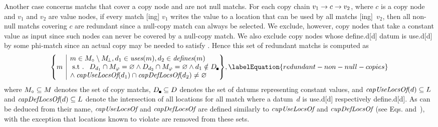 Another case concerns \glspl{match} that cover a \gls{copy node} and are not
\glspl{null match}.
%
For each copy chain \mbox{$v_1 \rightarrow c \rightarrow v_2$}, where $c$ is a
\gls{copy node} and $v_1$ and $v_2$ are \glspl{value node}, if every \gls{match}
[ing] $v_1$ writes the value to a location that can be used
by all \glspl{match} [ing]~$v_2$, then all non-\glspl{null
  match} covering $c$ are redundant since a \gls{null-copy match} can always be
selected.
%
We exclude, however, \glspl{copy node} that take a constant value as input since
such \glspl{node} can never be covered by a \gls{null-copy match}.
%
We also exclude \glspl{copy node} whose \gls{define.d}[d] \gls{datum} is
\gls{use.d}[d] by some \gls{phi-match} since an actual copy may be needed to
satisfy .
%
Hence this set of redundant \glspl{match} is computed as
%
\begin{equation}
  \mSetBuilder*{m}%
               {%
                 \begin{array}{@{}l@{}}
                   m \in \mCopyMatchSet \setminus \mNullMatchSet,
                   d_1 \in \mUses(m),
                   d_2 \in \mDefines(m) \\
                   \text{\st }
                   \mDataSet[d_1] \cap \mPhiMatchSet = \mEmptySet
                   \mAnd
                   \mDataSet[d_2] \cap \mPhiMatchSet = \mEmptySet
                   \mAnd
                   d_1 \notin \mConstDataSet \\
                   \mbox{}\hspace{-2pt} \mAnd
                   \mCapUseLocsOf(d_1) \cap \mCapDefLocsOf(d_2) \neq \mEmptySet
                 \end{array}
               }\!,
  \labelEquation{redundant-non-null-copies}
\end{equation}
%
where \mbox{$\mCopyMatchSet \subseteq \mMatchSet$} denotes the set of
\glspl{copy match}, \mbox{$\mConstDataSet \subseteq \mDataSet$} denotes the set
of \glspl{datum} representing constant values, and \mbox{$\operatorname{\textit{capUseLocsOf}}(d)
  \subseteq L$} and \mbox{$\operatorname{\textit{capDefLocsOf}}(d) \subseteq
  L$} denote the intersection of all locations for all \gls{match}
where a \gls{datum}~$d$ is \gls{use.d}[d] respectively \gls{define.d}[d].
%
As can be deduced from their name, $\operatorname{\textit{capUseLocsOf}}$ and $\operatorname{\textit{capDefLocsOf}}$ are
defined similarly to $\operatorname{\textit{cupUseLocsOf}}$ and $\operatorname{\textit{cupDefLocsOf}}$ (see
Eqs.\thinspace{}
and~), with the exception that locations
known to violate  are removed from these sets.


